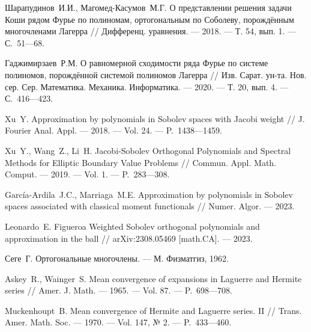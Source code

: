 \begin{thebibliography}{11}
{Шарапудинов~И.И., Магомед-Касумов~М.Г.} 
О представлении решения задачи Коши рядом Фурье по полиномам, ортогональным по Соболеву, порождённым многочленами Лагерра 
// 
Дифференц. уравнения. 
--- 2018. 
--- Т. 54, вып. 1. 
--- С.~51---68.





{Гаджимирзаев~Р.М.} 
О равномерной сходимости ряда Фурье по системе полиномов, порождённой системой полиномов Лагерра 
// 
Изв. Сарат. ун-та. Нов. сер. Сер. Математика. Механика. Информатика. 
--- 2020. 
--- Т. 20, вып. 4. 
--- С.~416---423.






{Xu~Y.} 
Approximation by polynomials in Sobolev spaces with Jacobi weight 
// 
J. Fourier Anal. Appl. 
--- 2018. 
--- Vol. 24. 
--- P.~1438---1459.



{Xu~Y., Wang~Z., Li~H.} 
Jacobi-Sobolev Orthogonal Polynomials and Spectral Methods for Elliptic Boundary Value Problems 
//
Commun. Appl. Math. Comput.
--- 2019.
--- Vol. 1.
--- P.~283---308.

{Garc\'ia-Ardila~J.C., Marriaga~M.E.}
Approximation by polynomials in Sobolev spaces associated with classical moment functionals 
//
Numer. Algor.
--- 2023.


{Leonardo~E. Figueroa} 
Weighted Sobolev orthogonal polynomials and approximation in the ball 
// 
arXiv:2308.05469 [math.CA].
--- 2023.





			
{Сеге~Г.} 
Ортогональные многочлены. 
--- М. Физматгиз, 1962.





{Askey~R., Wainger~S.} 
Mean convergence of expansions in Laguerre and Hermite series 
// 
Amer. J. Math.
--- 1965.
--- Vol. 87.
--- P.~698---708.





{Muckenhoupt~B.} 
Mean convergence of Hermite and Laguerre series. II 
// 
Trans. Amer. Math. Soc. 
--- 1970.
--- Vol. 147, № 2.
--- P.~433---460.






\end{thebibliography}
